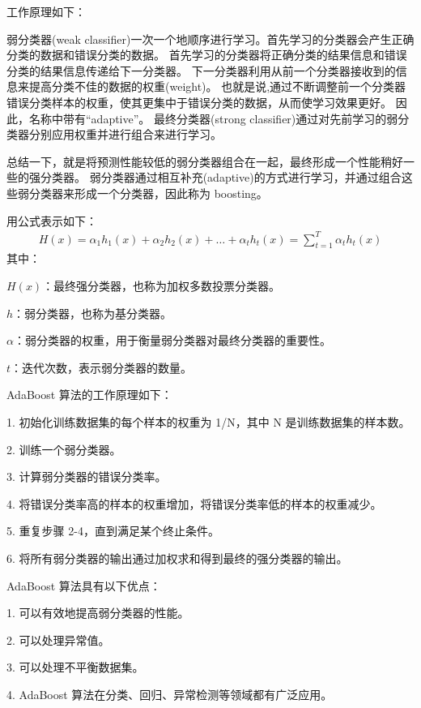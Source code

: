\documentclass[UTF8]{ctexart}
\begin{document}
工作原理如下：\par
弱分类器(weak classifier)一次一个地顺序进行学习。首先学习的分类器会产生正确分类的数据和错误分类的数据。
首先学习的分类器将正确分类的结果信息和错误分类的结果信息传递给下一分类器。
下一分类器利用从前一个分类器接收到的信息来提高分类不佳的数据的权重(weight)。
也就是说,通过不断调整前一个分类器错误分类样本的权重，使其更集中于错误分类的数据，从而使学习效果更好。
因此，名称中带有“adaptive”。
最终分类器(strong classifier)通过对先前学习的弱分类器分别应用权重并进行组合来进行学习。 \par

总结一下，就是将预测性能较低的弱分类器组合在一起，最终形成一个性能稍好一些的强分类器。
弱分类器通过相互补充(adaptive)的方式进行学习，并通过组合这些弱分类器来形成一个分类器，因此称为 boosting。 \par

用公式表示如下：
\begin{gather}
    H(x) = \alpha_1 h_1(x) + \alpha_2 h_2(x) + \dots + \alpha_t h_t(x) = \sum_{t = 1}^{T} \alpha_t h_t(x)
\end{gather}
其中：\par
$H(x)$：最终强分类器，也称为加权多数投票分类器。 \par
$h$：弱分类器，也称为基分类器。 \par
$\alpha$：弱分类器的权重，用于衡量弱分类器对最终分类器的重要性。 \par
$t$：迭代次数，表示弱分类器的数量。 \par

\noindent AdaBoost 算法的工作原理如下： \par
1. 初始化训练数据集的每个样本的权重为 1/N，其中 N 是训练数据集的样本数。\par
2. 训练一个弱分类器。\par
3. 计算弱分类器的错误分类率。\par
4. 将错误分类率高的样本的权重增加，将错误分类率低的样本的权重减少。\par
5. 重复步骤 2-4，直到满足某个终止条件。\par
6. 将所有弱分类器的输出通过加权求和得到最终的强分类器的输出。\par


\noindent AdaBoost 算法具有以下优点：\par
1. 可以有效地提高弱分类器的性能。\par
2. 可以处理异常值。\par
3. 可以处理不平衡数据集。\par
4. AdaBoost 算法在分类、回归、异常检测等领域都有广泛应用。\par
\end{document}
